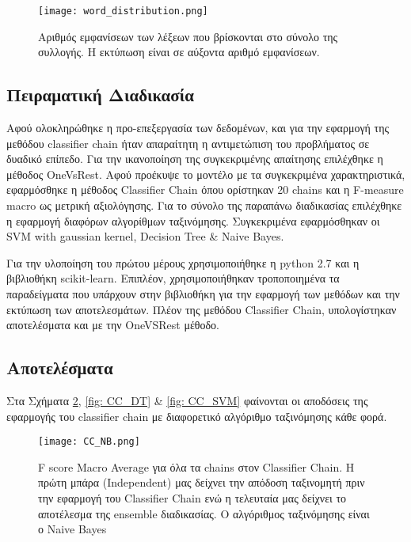 \begin{figure}
	\texttt{[image: word\_distribution.png]}
	\caption{Αριθμός εμφανίσεων των λέξεων που βρίσκονται στο σύνολο της συλλογής. Η εκτύπωση είναι σε αύξοντα αριθμό εμφανίσεων.}
	\label{fig: word_distribution}
\end{figure}


 
\subsection{Πειραματική Διαδικασία}


Αφού ολοκληρώθηκε η προ-επεξεργασία των δεδομένων, και για την εφαρμογή της μεθόδου classifier chain ήταν απαραίτητη η αντιμετώπιση του προβλήματος σε δυαδικό επίπεδο. Για την ικανοποίηση της συγκεκριμένης απαίτησης επιλέχθηκε η μέθοδος OneVsRest. Αφού προέκυψε το μοντέλο με τα συγκεκριμένα χαρακτηριστικά, εφαρμόσθηκε η μέθοδος Classifier Chain όπου ορίστηκαν 20 chains και η F-measure macro ως μετρική αξιολόγησης. Για το σύνολο της παραπάνω διαδικασίας επιλέχθηκε η εφαρμογή διαφόρων αλγορίθμων ταξινόμησης. Συγκεκριμένα εφαρμόσθηκαν οι SVM with gaussian kernel, Decision Tree \& Naive Bayes.

Για την υλοποίηση του πρώτου μέρους χρησιμοποιήθηκε η python 2.7 και η βιβλιοθήκη scikit-learn. Επιπλέον, χρησιμοποιήθηκαν τροποποιημένα τα παραδείγματα που υπάρχουν στην βιβλιοθήκη για την εφαρμογή των μεθόδων και την εκτύπωση των αποτελεσμάτων.
Πλέον της μεθόδου Classifier Chain, υπολογίστηκαν αποτελέσματα και με την OneVSRest μέθοδο.

\subsection{Αποτελέσματα}

Στα Σχήματα \ref{fig: CC_NB}, \ref{fig: CC_DT} \& \ref{fig: CC_SVM} φαίνονται οι αποδόσεις της εφαρμογής του classifier chain με διαφορετικό αλγόριθμο ταξινόμησης κάθε φορά.



\begin{figure}
	\texttt{[image: CC\_NB.png]}
	\caption{F score Macro Average για όλα τα chains στον Classifier Chain. Η πρώτη μπάρα (Independent) μας δείχνει την απόδοση ταξινομητή πριν την εφαρμογή του Classifier Chain ενώ η τελευταία μας δείχνει το αποτέλεσμα της ensemble διαδικασίας. Ο αλγόριθμος ταξινόμησης είναι ο Naive Bayes}
	\label{fig: CC_NB}
\end{figure}

